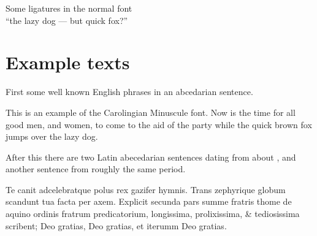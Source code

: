 \documentclass{article}
\newcommand{\Romannum}[1]{\uppercase\expandafter{\romannumeral #1}}
\newcommand{\Sentence}{%
This is an example of the Carolingian Minuscule font. Now is the time for all good
men, and women, to come to the aid of the party while the quick brown fox
jumps over the lazy dog.}
\newcommand{\latin}{Te canit adcelebratque polus rex gazifer hymnis.
  Trans zephyrique globum scandunt tua facta per axem.
  Explicit secunda pars summe fratris thome de aquino ordinis fratrum 
  predicatorium, longissima, prolixissima, \& tediosissima scribent;
  Deo gratias, Deo gratias, et iterumm Deo gratias. }
\begin{document}
\begin{center}
    Some ligatures in the normal font \\
{``the lazy dog --- but quick fox?''}
\end{center}

\section{Example texts}

    First some well known English phrases in an abcedarian sentence.

\Sentence{}

    After this there are two Latin abecedarian sentences dating from about 
\Romannum{790}, and another sentence from roughly the same period.

\latin{}

    
\end{document}

